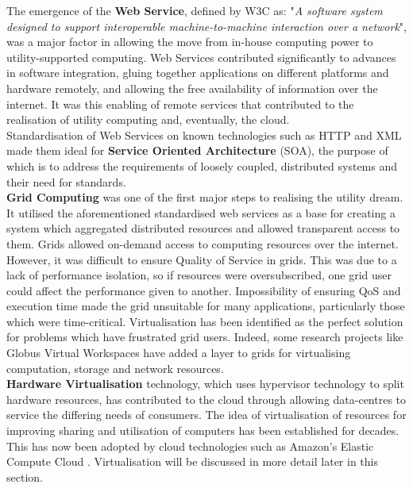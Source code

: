 The emergence of the \textbf{Web Service}, defined by W3C as: "\textit{A software system designed to support interoperable machine-to-machine interaction over a network}"\cite{w3cwebservice}, was a major factor in allowing the move from in-house computing power to utility-supported computing\cite{principlesparadigms}. Web Services contributed significantly to advances in software integration\cite{soapapazoglou}, gluing together applications on different platforms and hardware remotely, and allowing the free availability of information over the internet. It was this enabling of remote services that contributed to the realisation of utility computing and, eventually, the cloud. \\
Standardisation of Web Services on known technologies such as HTTP and XML made them ideal for \textbf{Service Oriented Architecture} (SOA), the purpose of which is to address the requirements of loosely coupled, distributed systems and their need for standards\cite{principlesparadigms}. \\
\textbf{Grid Computing} was one of the first major steps to realising the utility dream. It utilised the aforementioned standardised web services as a base for creating a system which aggregated distributed resources and allowed transparent access to them\cite{principlesparadigms}. Grids allowed on-demand access to computing resources over the internet. However, it was difficult to ensure Quality of Service in grids\cite{buyyamarketorientedcomputing}. This was due to a lack of performance isolation, so if resources were oversubscribed, one grid user could affect the performance given to another. Impossibility of ensuring QoS and execution time made the grid unsuitable for many applications, particularly those which were time-critical\cite{virtualworkspaces}. Virtualisation has been identified as the perfect solution for problems which have frustrated grid users. Indeed, some research projects like Globus Virtual Workspaces have added a layer to grids for virtualising computation, storage and network resources\cite{virtualworkspaces}. \\
\textbf{Hardware Virtualisation} technology, which uses hypervisor technology to split hardware resources, has contributed to the cloud through allowing data-centres to service the differing needs of consumers. The idea of virtualisation of resources for improving sharing and utilisation of computers has been established for decades\cite{surveyvmresearch}. This has now been adopted by cloud technologies such as Amazon's Elastic Compute Cloud \cite{amazonec2}. Virtualisation will be discussed in more detail later in this section. 

